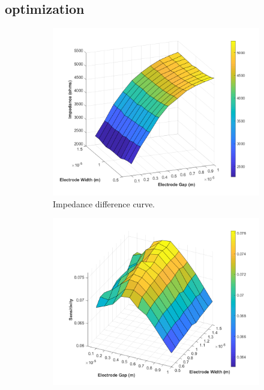\FloatBarrier

\subsection{optimization}



\begin{figure}[h]
    \centering
    \begin{subfigure}[t]{0.49\textwidth}
        \centering
        \includegraphics[width=\textwidth]{images/comsol_simple_difference.png}
        \caption{Impedance difference curve.}
    \end{subfigure}
    \hfill
    \begin{subfigure}[t]{0.49\textwidth}
        \centering
        \includegraphics[width=\textwidth]{images/comsol_simple_sensitivity_surface.png}

\end{subfigure}
\end{figure}
